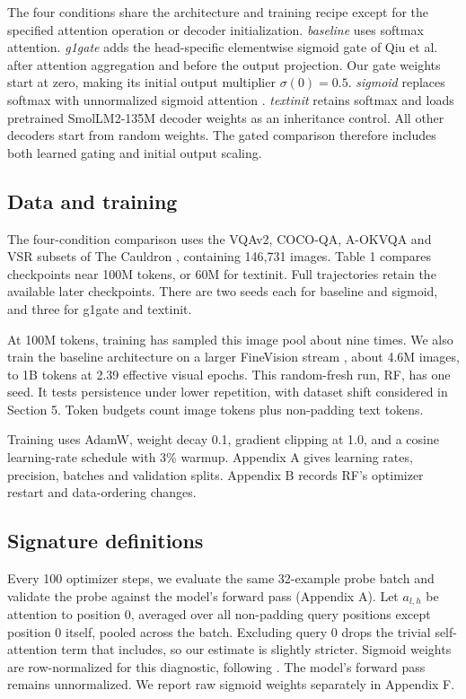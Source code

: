 \documentclass{article}
\begin{document}
The four conditions share the architecture and training recipe except for the specified attention operation or decoder initialization. \textit{baseline} uses softmax attention. \textit{g1gate} adds the head-specific elementwise sigmoid gate of Qiu et al. \cite{ref20} after attention aggregation and before the output projection. Our gate weights start at zero, making its initial output multiplier $\sigma(0)=0.5$. \textit{sigmoid} replaces softmax with unnormalized sigmoid attention \cite{ref6}. \textit{textinit} retains softmax and loads pretrained SmolLM2-135M decoder weights as an inheritance control. All other decoders start from random weights. The gated comparison therefore includes both learned gating and initial output scaling.

\subsection{Data and training}

The four-condition comparison uses the VQAv2, COCO-QA, A-OKVQA and VSR subsets of The Cauldron \cite{ref21}, containing 146,731 images. Table 1 compares checkpoints near 100M tokens, or 60M for textinit. Full trajectories retain the available later checkpoints. There are two seeds each for baseline and sigmoid, and three for g1gate and textinit.

At 100M tokens, training has sampled this image pool about nine times. We also train the baseline architecture on a larger FineVision stream \cite{ref22}, about 4.6M images, to 1B tokens at 2.39 effective visual epochs. This random-fresh run, RF, has one seed. It tests persistence under lower repetition, with dataset shift considered in Section 5. Token budgets count image tokens plus non-padding text tokens.

Training uses AdamW, weight decay 0.1, gradient clipping at 1.0, and a cosine learning-rate schedule with 3\% warmup. Appendix A gives learning rates, precision, batches and validation splits. Appendix B records RF's optimizer restart and data-ordering changes.

\subsection{Signature definitions}

Every 100 optimizer steps, we evaluate the same 32-example probe batch and validate the probe against the model's forward pass (Appendix A). Let $a_{l,h}$ be attention to position 0, averaged over all non-padding query positions except position 0 itself, pooled across the batch. Excluding query 0 drops the trivial self-attention term that \cite{ref6} includes, so our estimate is slightly stricter. Sigmoid weights are row-normalized for this diagnostic, following \cite{ref6}. The model's forward pass remains unnormalized. We report raw sigmoid weights separately in Appendix F.
\end{document}
